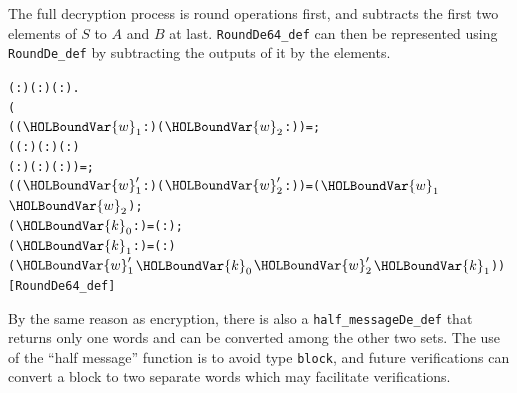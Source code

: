 \documentclass{article}
\begin{document}
The full decryption process is round operations first, and subtracts the first two elements of $S$ to $A$ and $B$ at last.
\verb|RoundDe64_def| can then be represented using \verb|RoundDe_def| by subtracting the outputs of it by the elements.

\begin{alltt}
\HOLTokenTurnstile{} \HOLSymConst{\HOLTokenForall{}}( :) ( :) ( :).
         \HOLSymConst{=}
     (
        ((\ensuremath{\HOLBoundVar{w}\sb{\mathrm{1}}} :)\HOLSymConst{,}(\ensuremath{\HOLBoundVar{w}\sb{\mathrm{2}}} :)) =  ;
        (( :)\HOLSymConst{,}( :)\HOLSymConst{,}( : )\HOLSymConst{,}
           ( : )\HOLSymConst{,}( :)\HOLSymConst{,}( :)) =   ;
        ((\ensuremath{\HOLBoundVar{w}\sb{\mathrm{1}}\sp{\prime{}}} :)\HOLSymConst{,}(\ensuremath{\HOLBoundVar{w}\sb{\mathrm{2}}\sp{\prime{}}} :)) =    (\ensuremath{\HOLBoundVar{w}\sb{\mathrm{1}}}\HOLSymConst{,}\ensuremath{\HOLBoundVar{w}\sb{\mathrm{2}}});
        (\ensuremath{\HOLBoundVar{k}\sb{\mathrm{0}}} :) =  ( :) ;
        (\ensuremath{\HOLBoundVar{k}\sb{\mathrm{1}}} :) =  ( :) 
         (\ensuremath{\HOLBoundVar{w}\sb{\mathrm{1}}\sp{\prime{}}} \HOLSymConst{\ensuremath{-}} \ensuremath{\HOLBoundVar{k}\sb{\mathrm{0}}}\HOLSymConst{,}\ensuremath{\HOLBoundVar{w}\sb{\mathrm{2}}\sp{\prime{}}} \HOLSymConst{\ensuremath{-}} \ensuremath{\HOLBoundVar{k}\sb{\mathrm{1}}}))\hfill{[RoundDe64_def]}
\end{alltt}

By the same reason as encryption, there is also a \verb|half_messageDe_def| that returns only one words and can be converted
among the other two sets. The use of the ``half message'' function is to avoid type \verb|block|, and future verifications
can convert a block to two separate words which may facilitate verifications.
\end{document}

